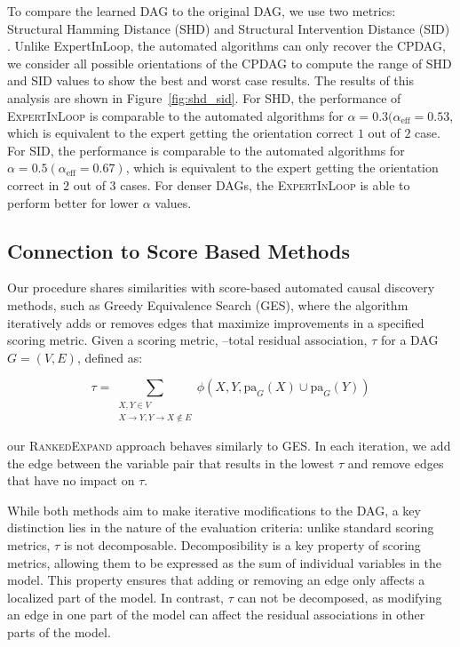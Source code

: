 \documentclass{uai2025} %
\begin{document}
To compare the learned DAG to the original DAG, we use two metrics: Structural
Hamming Distance (SHD) and Structural Intervention Distance (SID)
\citep{Peters2015}. Unlike \textrm{ExpertInLoop}, the automated algorithms can
only recover the CPDAG, we consider all possible orientations of the CPDAG to
compute the range of SHD and SID values to show the best and worst case
results. The results of this analysis are shown in Figure~\ref{fig:shd_sid}.
For SHD, the performance of \textsc{ExpertInLoop} is comparable to the
automated algorithms for $ \alpha = 0.3 (\alpha_{\textrm{eff}} = 0.53 $, which
is equivalent to the expert getting the orientation correct $ 1 $ out of $ 2 $
case. For SID, the performance is comparable to the automated algorithms for $
\alpha = 0.5 (\alpha_{\textrm{eff}} = 0.67) $, which is equivalent to the
expert getting the orientation correct in $ 2 $ out of $ 3 $ cases. For denser
DAGs, the \textsc{ExpertInLoop} is able to perform better for lower $ \alpha $
values.

\subsection{Connection to Score Based Methods}

Our procedure shares similarities with score-based automated causal discovery
methods, such as Greedy Equivalence Search (GES), where the algorithm
iteratively adds or removes edges that maximize improvements in a specified
scoring metric. Given a scoring metric, --total residual association, $ \tau $ for 
a DAG $ G = (V, E) $, defined as:

\begin{equation}
	\tau = \sum_{\substack{X, Y \in V \\ X \rightarrow Y, Y \rightarrow X \not \in E}}   \phi(X, Y, \mathrm{pa}_G(X) \cup \mathrm{pa}_G(Y))
\end{equation}

our \textsc{RankedExpand} approach behaves similarly to GES. In each iteration,
we add the edge between the variable pair that results in the lowest $ \tau $
and remove edges that have no impact on $ \tau $.

While both methods aim to make iterative modifications to the DAG, a key
distinction lies in the nature of the evaluation criteria: unlike standard
scoring metrics, $ \tau $ is not decomposable. Decomposibility is a key
property of scoring metrics, allowing them to be expressed as the sum of
individual variables in the model. This property ensures that adding or
removing an edge only affects a localized part of the model. In contrast, $
\tau $ can not be decomposed, as modifying an edge in one part of the model can
affect the residual associations in other parts of the model.
\end{document}
